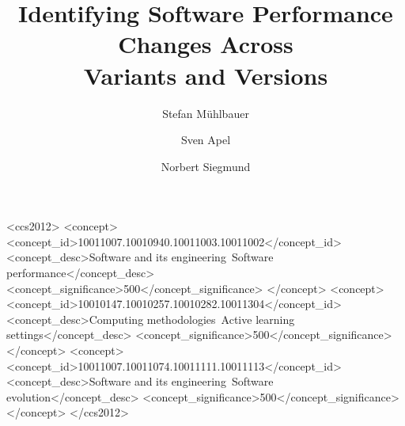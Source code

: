 \documentclass[sigconf]{acmart}
\begin{document}
	
	\title[Identifying Software Performance Changes Across Variants and Versions]{\texorpdfstring{Identifying Software Performance Changes Across\\ Variants and Versions}{Identifying Software Performance Changes Across Variants and Versions}}
	
	
	\author{Stefan Mühlbauer}
	
	\author{Sven Apel}
	
	\author{Norbert Siegmund}
	
	
	\begin{CCSXML}
		<ccs2012>
		<concept>
		<concept_id>10011007.10010940.10011003.10011002</concept_id>
		<concept_desc>Software and its engineering~Software performance</concept_desc>
		<concept_significance>500</concept_significance>
		</concept>
		<concept>
		<concept_id>10010147.10010257.10010282.10011304</concept_id>
		<concept_desc>Computing methodologies~Active learning settings</concept_desc>
		<concept_significance>500</concept_significance>
		</concept>
		<concept>
		<concept_id>10011007.10011074.10011111.10011113</concept_id>
		<concept_desc>Software and its engineering~Software evolution</concept_desc>
		<concept_significance>500</concept_significance>
		</concept>
		</ccs2012>
	\end{CCSXML}
	
\end{document}
